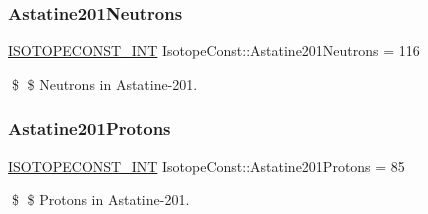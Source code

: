 \subsubsection{\texorpdfstring{Astatine201\+Neutrons}{Astatine201Neutrons}}
{\footnotesize\ttfamily \mbox{\hyperlink{group___isotope_const-_macros_ga5f18360b3e99483a35c32d789e62621c}{I\+S\+O\+T\+O\+P\+E\+C\+O\+N\+S\+T\+\_\+\+I\+NT}} Isotope\+Const\+::\+Astatine201\+Neutrons = 116}

\$ \$ Neutrons in Astatine-\/201. \mbox{\label{group___isotope_const-_astatine-_at201_ga847cf81d89531b3a16e4c5115bdb304d}} 
\subsubsection{\texorpdfstring{Astatine201\+Protons}{Astatine201Protons}}
{\footnotesize\ttfamily \mbox{\hyperlink{group___isotope_const-_macros_ga5f18360b3e99483a35c32d789e62621c}{I\+S\+O\+T\+O\+P\+E\+C\+O\+N\+S\+T\+\_\+\+I\+NT}} Isotope\+Const\+::\+Astatine201\+Protons = 85}

\$ \$ Protons in Astatine-\/201. 